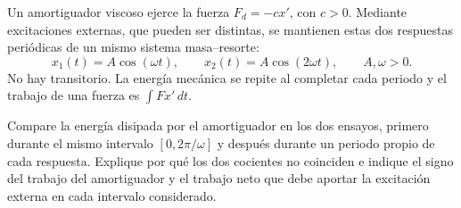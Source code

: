 Un amortiguador viscoso ejerce la fuerza \(F_d=-c x'\), con \(c>0\). Mediante excitaciones externas, que pueden ser distintas, se mantienen estas dos respuestas periódicas de un mismo sistema masa--resorte:
\[
x_1(t)=A\cos(\omega t),\qquad x_2(t)=A\cos(2\omega t),
\qquad A,\omega>0.
\]
No hay transitorio. La energía mecánica se repite al completar cada periodo y el trabajo de una fuerza es \(\int F x'\,dt\).

Compare la energía disipada por el amortiguador en los dos ensayos, primero durante el mismo intervalo \([0,2\pi/\omega]\) y después durante un periodo propio de cada respuesta. Explique por qué los dos cocientes no coinciden e indique el signo del trabajo del amortiguador y el trabajo neto que debe aportar la excitación externa en cada intervalo considerado.
